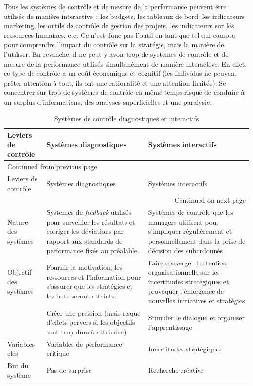 \documentclass{kaobook}
\begin{document}
Tous les systèmes de contrôle et de mesure de la performance peuvent être utilisés de manière interactive : les budgets, les tableaux de bord, les indicateurs marketing, les outils de contrôle de gestion des projets, les indicateurs sur les ressources humaines, etc. Ce n'est donc pas l'outil en tant que tel qui compte pour comprendre l'impact du contrôle sur la stratégie, mais la manière de l'utiliser. En revanche, il ne peut y avoir trop de systèmes de contrôle et de mesure de la performance utilisés simultanément de manière interactive. En effet, ce type de contrôle a un coût économique et cognitif (les individus ne peuvent prêter attention à tout, ils ont une rationalité et une attention limitée). Se concentrer sur trop de systèmes de contrôle en même temps risque de conduire à un surplus d'informations, des analyses superficielles et une paralysie.\\

\begin{longtable}{p{2cm} p{7cm} p{7cm}}
\caption{Systèmes de contrôle diagnostiques et interactifs}
\\
Leviers de contrôle & Systèmes diagnostiques & Systèmes interactifs\\
\hline
\endfirsthead
\multicolumn{3}{l}{Continued from previous page} \\
\hline

Leviers de contrôle & Systèmes diagnostiques & Systèmes interactifs \\

\hline
\endhead
\hline\multicolumn{3}{r}{Continued on next page} \\
\endfoot
\endlastfoot
\hline
Nature des systèmes & Systèmes de \emph{feedback} utilisés pour surveiller les résultats et corriger les déviations par rapport aux standards de performance fixés au préalable. & Systèmes de contrôle que les managers utilisent pour s'impliquer régulièrement et personnellement dans la prise de décision des subordonnés\\
Objectif des systèmes & Fournir la motivation, les ressources et l'information pour s'assurer que les stratégies et les buts seront atteints & Faire converger l'attention organisationnelle sur les incertitudes stratégiques et provoquer l'émergence de nouvelles initiatives et stratégies\\
 & Créer une pression (mais risque d'effets pervers si les objectifs sont trop durs à atteindre). & Stimuler le dialogue et organiser l'apprentissage\\
Variables clés & Variables de performance critique & Incertitudes stratégiques\\
But du système & Pas de surprise & Recherche créative\\
\end{longtable}
\end{document}
